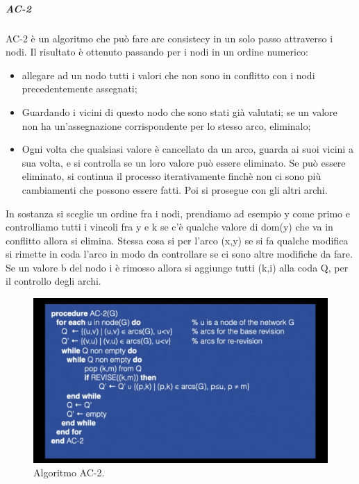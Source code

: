 \subparagraph{AC-2}
AC-2 è un algoritmo che può fare arc consistecy in un solo passo attraverso i nodi. Il risultato è ottenuto passando per i nodi in un ordine numerico:
\begin{itemize}
    \item allegare ad un nodo tutti i valori che non sono in conflitto con i nodi precedentemente assegnati;
    \item Guardando i vicini di questo nodo che sono stati già valutati; se un valore non ha un'assegnazione corrispondente per lo stesso arco, eliminalo;
    \item Ogni volta che qualsiasi valore è cancellato da un arco, guarda ai suoi vicini a sua volta, e si controlla se un loro valore può essere eliminato. Se può essere eliminato, si continua il processo iterativamente finchè non ci sono più cambiamenti che possono essere fatti. Poi si prosegue con gli altri archi.
\end{itemize}
In sostanza si sceglie un ordine fra i nodi, prendiamo ad esempio y come primo e controlliamo tutti i vincoli fra y e k se c'è qualche valore di dom(y) che va in conflitto allora si elimina. Stessa cosa si per l'arco (x,y) se si fa qualche modifica si rimette in coda l'arco in modo da controllare se ci sono altre modifiche da fare. Se un valore b del nodo i è rimosso allora si aggiunge tutti (k,i) alla coda Q, per il controllo degli archi.
\begin{figure}[H]
    \centering
    \includegraphics[width=13cm, keepaspectratio]{img/ac-2.png}
    \caption{Algoritmo AC-2.}\label{fig:ac2}
\end{figure}

